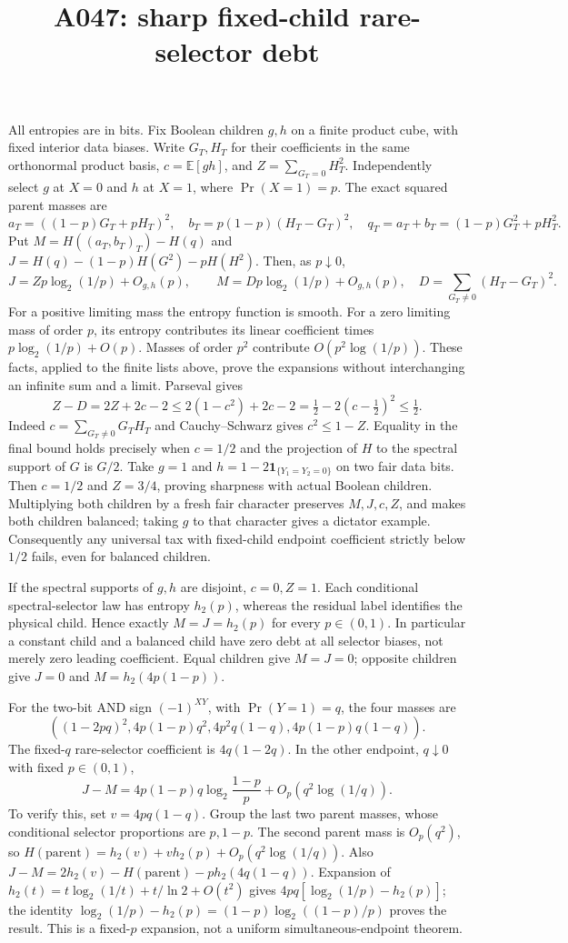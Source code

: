 \documentclass{article}
\begin{document}
\title{A047: sharp fixed-child rare-selector debt}
\maketitle
All entropies are in bits. Fix Boolean children $g,h$ on a finite product cube,
with fixed interior data biases. Write $G_T,H_T$ for their coefficients in the
same orthonormal product basis, $c=\mathbb E[gh]$, and
$Z=\sum_{G_T=0}H_T^2$. Independently select $g$ at $X=0$ and $h$ at
$X=1$, where $\Pr(X=1)=p$. The exact squared parent masses are
\[
 a_T=((1-p)G_T+pH_T)^2,\quad b_T=p(1-p)(H_T-G_T)^2,
 \quad q_T=a_T+b_T=(1-p)G_T^2+pH_T^2.
\]
Put $M=H((a_T,b_T)_T)-H(q)$ and
$J=H(q)-(1-p)H(G^2)-pH(H^2)$. Then, as $p\downarrow0$,
\[
 J=Zp\log_2(1/p)+O_{g,h}(p),\qquad
 M=Dp\log_2(1/p)+O_{g,h}(p),\quad
 D=\sum_{G_T\ne0}(H_T-G_T)^2.
\]
For a positive limiting mass the entropy function is smooth. For a zero
limiting mass of order $p$, its entropy contributes its linear coefficient
times $p\log_2(1/p)+O(p)$. Masses of order $p^2$ contribute
$O(p^2\log(1/p))$. These facts, applied to the finite lists above, prove
the expansions without interchanging an infinite sum and a limit.
Parseval gives
\[
 Z-D=2Z+2c-2\le 2(1-c^2)+2c-2
 =\tfrac12-2(c-\tfrac12)^2\le\tfrac12.
\]
Indeed $c=\sum_{G_T\ne0}G_TH_T$ and Cauchy--Schwarz gives
$c^2\le1-Z$. Equality in the final bound holds precisely when
$c=1/2$ and the projection of $H$ to the spectral support of $G$ is $G/2$.
Take $g=1$ and $h=1-2\mathbf1_{\{Y_1=Y_2=0\}}$ on two fair data bits.
Then $c=1/2$ and $Z=3/4$, proving sharpness with actual Boolean children.
Multiplying both children by a fresh fair character preserves $M,J,c,Z$,
and makes both children balanced; taking $g$ to that character gives a
dictator example. Consequently any universal tax with fixed-child endpoint
coefficient strictly below $1/2$ fails, even for balanced children.

If the spectral supports of $g,h$ are disjoint, $c=0,Z=1$.
Each conditional spectral-selector law has entropy $h_2(p)$, whereas the
residual label identifies the physical child. Hence exactly
$M=J=h_2(p)$ for every $p\in(0,1)$. In particular a constant child and
a balanced child have zero debt at all selector biases, not merely zero
leading coefficient. Equal children give $M=J=0$; opposite children give
$J=0$ and $M=h_2(4p(1-p))$.

For the two-bit AND sign $(-1)^{XY}$, with $\Pr(Y=1)=q$, the four masses are
\[
 ((1-2pq)^2,4p(1-p)q^2,4p^2q(1-q),4p(1-p)q(1-q)).
\]
The fixed-$q$ rare-selector coefficient is $4q(1-2q)$. In the other
endpoint, $q\downarrow0$ with fixed $p\in(0,1)$,
\[
 J-M=4p(1-p)q\log_2\frac{1-p}{p}+O_p(q^2\log(1/q)).
\]
To verify this, set $v=4pq(1-q)$. Group the last two parent masses,
whose conditional selector proportions are $p,1-p$. The second parent
mass is $O_p(q^2)$, so
$H(\text{parent})=h_2(v)+v h_2(p)+O_p(q^2\log(1/q))$.
Also $J-M=2h_2(v)-H(\text{parent})-p h_2(4q(1-q))$.
Expansion of $h_2(t)=t\log_2(1/t)+t/\ln2+O(t^2)$ gives
$4pq[\log_2(1/p)-h_2(p)]$; the identity
$\log_2(1/p)-h_2(p)=(1-p)\log_2((1-p)/p)$ proves the result.
This is a fixed-$p$ expansion, not a uniform simultaneous-endpoint theorem.
\end{document}
